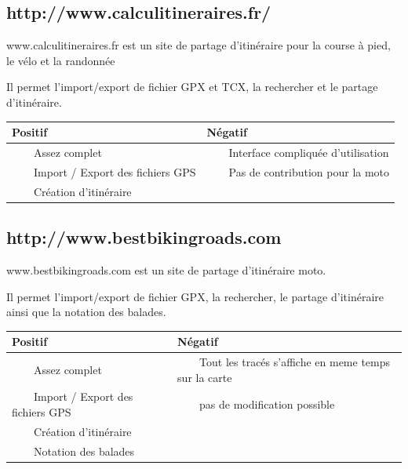 \documentclass[a4paper]{article}
\newcommand{\tabitem}{~~\llap{\textbullet}~~}
\begin{document}
\subsection{http://www.calculitineraires.fr/}

www.calculitineraires.fr est un site de partage d'itinéraire pour la course à pied, le vélo et la randonnée

Il permet l'import/export de fichier GPX et TCX, la rechercher et le partage d'itinéraire.

\begin{tabular}{|l|l|}
	\hline
	Positif                                   & Négatif                                     \\ \hline\hline
	\tabitem Assez complet                    & \tabitem Interface compliquée d'utilisation \\
	\tabitem Import / Export des fichiers GPS & \tabitem Pas de contribution pour la moto   \\
	\tabitem Création d'itinéraire            &                                             \\ \hline
\end{tabular}


\subsection{http://www.bestbikingroads.com}
www.bestbikingroads.com est un site de partage d'itinéraire moto.


Il permet l'import/export de fichier GPX, la rechercher, le partage d'itinéraire ainsi que la notation des balades.

\begin{tabular}{|l|l|}
	\hline
	Positif                                   & Négatif                                                       \\ \hline\hline
	\tabitem Assez complet                    & \tabitem Tout les tracés s'affiche en meme temps sur la carte \\
	\tabitem Import / Export des fichiers GPS & \tabitem pas de modification possible                         \\
	\tabitem Création d'itinéraire            &                                                               \\
	\tabitem Notation des balades             &                                                               \\ \hline
\end{tabular}
\end{document}
